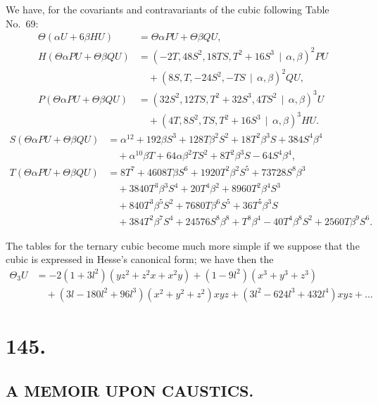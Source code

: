 \documentclass[11pt,a4paper]{article}
\begin{document}
We have, for the covariants and contravariants of the cubic following Table No.~69:
\begin{align*}
\Theta(\alpha U + 6\beta HU) &= \Theta\alpha PU + \Theta\beta QU,\\
H(\Theta\alpha PU + \Theta\beta QU) &= (-2T, 48S^2, 18TS, T^2 + 16S^3 \, \mid\, \alpha, \beta)^2 PU\\
&\quad + (8S, T, -24S^2, -TS \, \mid\, \alpha, \beta)^2 QU,\\
P(\Theta\alpha PU + \Theta\beta QU) &= (32S^2, 12TS, T^2 + 32S^3, 4TS^2 \, \mid\, \alpha, \beta)^3 U\\
&\quad + (4T, 8S^2, TS, T^2 + 16S^3 \, \mid\, \alpha, \beta)^3 HU.
\end{align*}
\begin{align*}
S(\Theta\alpha PU + \Theta\beta QU) &= \alpha^{12} + 192\beta S^3 + 128T\beta^2S^2 + 18T^2\beta^3S + 384S^4\beta^4\\
&\quad + \alpha^{10}\beta T + 64\alpha\beta^2TS^2 + 8T^2\beta^3S - 64S^4\beta^4,\\
T(\Theta\alpha PU + \Theta\beta QU) &= 8T^7 + 4608T\beta S^6 + 1920T^2\beta^2S^5 + 73728S^8\beta^3\\
&\quad + 3840T^3\beta^3S^4 + 20T^4\beta^2 + 8960T^2\beta^4S^3\\
&\quad + 840T^3\beta^5S^2 + 7680T\beta^6S^5 + 36T^5\beta^3S\\
&\quad + 384T^2\beta^7S^4 + 24576S^8\beta^8 + T^8\beta^4 - 40T^4\beta^8S^2 + 2560T\beta^9S^6.
\end{align*}

The tables for the ternary cubic become much more simple if we suppose that
the cubic is expressed in Hesse's canonical form; we have then the
\begin{align*}
\Theta_3 U &= -2(1 + 3l^2)(yz^2 + z^2x + x^2y) + (1 - 9l^2)(x^3 + y^3 + z^3)\\
&\quad + (3l - 180l^2 + 96l^3)(x^2 + y^2 + z^2)xyz + (3l^2 - 624l^3 + 432l^4)xyz + \ldots
\end{align*}

\clearpage
\section*{145.}
\subsection*{A MEMOIR UPON CAUSTICS.}
\end{document}
